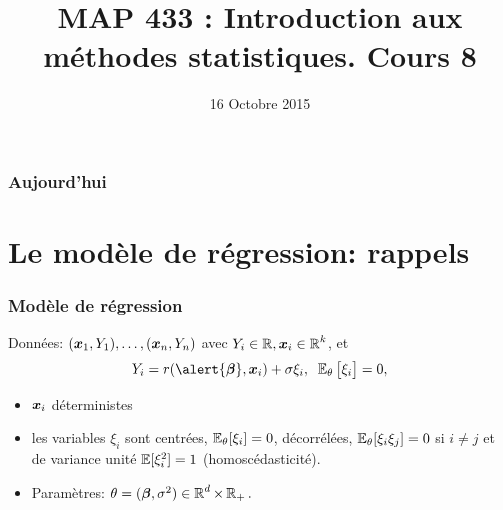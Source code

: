 


\title{MAP 433 : Introduction aux méthodes statistiques. Cours 8}

\date{16 Octobre 2015}
\maketitle



\begin{frame}
\frametitle{Aujourd'hui}
\tableofcontents
\end{frame}

\section{Le modèle de régression: rappels}
\begin{frame}
\frametitle{Modèle de régression}
\begin{df}
Données: $(\operatorname{\boldsymbol{x}}_1,Y_1),\ldots, (\operatorname{\boldsymbol{x}}_n,Y_n)$ avec $Y_i \in \operatorname{{\mathbb R}}, \operatorname{\boldsymbol{x}}_i\in \operatorname{{\mathbb R}}^k$, et
$$
Y_i = r(\alert{\truebeta},\bx_i)+ \sigma \xi_i,\;\;\E_{\truetheta}\big[\xi_i\big]=0,
$$
\begin{itemize}
\item \alert<1>{$\operatorname{\boldsymbol{x}}_i$ déterministes}
\item \alert<2>{ les variables $\xi_i$ sont centrées, $\operatorname{{\mathbb E}}_{\theta}[\xi_i]=0$,
décorrélées, $\operatorname{{\mathbb E}}_{\theta}[\xi_i \xi_j]= 0$ si $i \ne j$ et de variance unité $\operatorname{{\mathbb E}}[\xi_i^2]= 1$ \alert{ (homoscédasticité)}.}
\item \alert<3>{\alert{Paramètres}: $\theta= (\boldsymbol{\beta},\sigma^2) \in  \operatorname{{\mathbb R}}^d \times \operatorname{{\mathbb R}}_+.$}
\end{itemize}
\end{df}


\end{frame}

